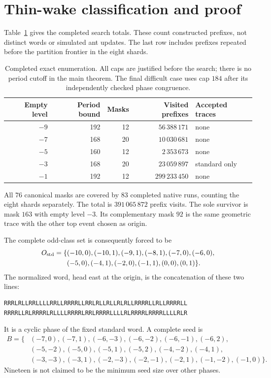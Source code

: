 \documentclass[11pt]{article}
\theoremstyle{definition}\newtheorem{definition}[theorem]{Definition}
\begin{document}
\section{Thin-wake classification and proof}\label{sec:classification}
Table~\ref{tab:classification} gives the completed search totals. These count
constructed prefixes, not distinct words or simulated ant updates. The last
row includes prefixes repeated before the partition frontier in the eight shards.

\begin{table}[ht]
\centering
\begin{tabular}{@{}rrrrl@{}}
\toprule
Empty level & Period bound & Masks & Visited prefixes & Accepted traces\\
\midrule
$-9$ & 192 & 12 & $56\,388\,171$ & none\\
$-7$ & 168 & 20 & $10\,030\,681$ & none\\
$-5$ & 160 & 12 & $2\,353\,673$ & none\\
$-3$ & 168 & 20 & $23\,059\,897$ & standard only\\
$-1$ & 192 & 12 & $299\,233\,450$ & none\\
\bottomrule
\end{tabular}
\caption{Completed exact enumeration. All caps are justified before the search;
there is no period cutoff in the main theorem. The final difficult case uses
cap $184$ after its independently checked phase congruence.}
\label{tab:classification}
\end{table}

All $76$ canonical masks are covered by $83$ completed native runs, counting
the eight shards separately. The total is $391\,065\,872$ prefix visits. The
sole survivor is mask $163$ with empty level $-3$. Its complementary mask $92$
is the same geometric trace with the other top event chosen as origin.

The complete odd-class set is consequently forced to be
\begin{align*}
O_{\rm std}=\{&(-10,0),(-10,1),(-9,1),(-8,1),(-7,0),(-6,0),\\
&(-5,0),(-4,1),(-2,0),(-1,1),(0,0),(0,1)\}.
\end{align*}
The normalized word, head east at the origin, is the concatenation of these two lines:
\begin{lstlisting}
RRRLRLLRRLLLLRRLLRRRRLLRRLRLLRLLRLRLLRRRRLLRLLRRRRLL
RRRRLLRLRRRRLRLLLLRRRRLRRLRRRRLLLLRLRRRRLRRRRLLLLRLR
\end{lstlisting}
It is a cyclic phase of the fixed standard word. A complete seed is
\begin{align*}
B=\{&(-7,0),(-7,1),(-6,-3),(-6,-2),(-6,-1),(-6,2),\\
&(-5,-2),(-5,0),(-5,1),(-5,2),(-4,-2),(-4,1),\\
&(-3,-3),(-3,1),(-2,-3),(-2,-1),(-2,1),(-1,-2),(-1,0)\}.
\end{align*}
Nineteen is not claimed to be the minimum seed size over other phases.
\end{document}
